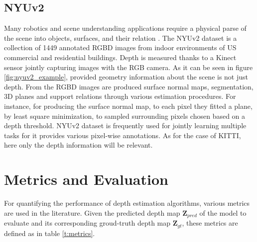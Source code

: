 \subsection{NYUv2}
Many robotics and scene understanding applications require a physical parse of the scene into objects, surfaces, and their relation \cite{NYUv2}.
The NYUv2 dataset \cite{NYUv2} is a collection of 1449 annotated RGBD images from indoor environments of US commercial and residential buildings.
Depth is measured thanks to a Kinect sensor jointly capturing images with the RGB camera.
As it can be seen in figure \ref{fig:nyuv2_example}, provided geometry information about the scene is not just depth.
From the RGBD images are produced surface normal maps, segmentation, 3D planes and support relations through various estimation procedures.
For instance, for producing the surface normal map, to each pixel they fitted a plane, by least square minimization, to sampled surrounding pixels chosen based on a depth threshold.
NYUv2 dataset is frequently used for jointly learning multiple tasks for it provides various pixel-wise annotations.
As for the case of KITTI, here only the depth information will be relevant.

\section{Metrics and Evaluation}

For quantifying the performance of depth estimation algorithms, various metrics are used in the literature.
Given the predicted depth map $\mathbf{Z}_{pred}$ of the model to evaluate and its corresponding groud-truth depth map $\mathbf{Z}_{gt}$, these metrics are defined as in table \ref{t:metrics}.

